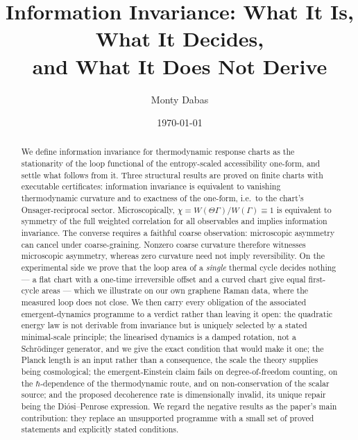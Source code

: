 \documentclass[aps,prd,twocolumn,superscriptaddress,nofootinbib]{revtex4-2}
\begin{document}
\title{Information Invariance: What It Is, What It Decides,\\
and What It Does Not Derive}

\author{Monty Dabas}

\date{\today}

\begin{abstract}
We define information invariance for thermodynamic response charts as the
stationarity of the loop functional of the entropy-scaled accessibility
one-form, and settle what follows from it. Three structural results are proved
on finite charts with executable certificates: information invariance is
equivalent to vanishing thermodynamic curvature and to exactness of the
one-form, i.e.\ to the chart's Onsager-reciprocal sector. Microscopically,
$\chi=W(\Theta\Gamma)/W(\Gamma)\equiv1$ is equivalent to symmetry of the full
weighted correlation for all observables and implies information invariance.
The converse requires a faithful coarse observation: microscopic asymmetry
can cancel under coarse-graining. Nonzero coarse curvature therefore witnesses
microscopic asymmetry, whereas zero curvature need not imply reversibility. On the experimental side we prove that the loop area of a
\emph{single} thermal cycle decides nothing --- a flat chart with a one-time
irreversible offset and a curved chart give equal first-cycle areas --- which we
illustrate on our own graphene Raman data, where the measured loop does not
close. We then carry every obligation of the associated emergent-dynamics
programme to a verdict rather than leaving it open: the quadratic energy law is
not derivable from invariance but is uniquely selected by a stated
minimal-scale principle; the linearised dynamics is a damped rotation, not a
Schr\"odinger generator, and we give the exact condition that would make it
one; the Planck length is an input rather than a consequence, the scale the
theory supplies being cosmological; the emergent-Einstein claim fails on
degree-of-freedom counting, on the $\hbar$-dependence of the thermodynamic
route, and on non-conservation of the scalar source; and the proposed
decoherence rate is dimensionally invalid, its unique repair being the
Di\'osi--Penrose expression. We regard the negative results as the paper's main
contribution: they replace an unsupported programme with a small set of proved
statements and explicitly stated conditions.
\end{abstract}
\end{document}
